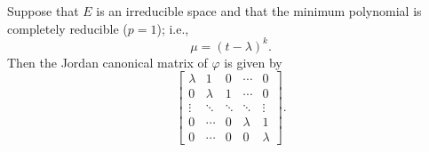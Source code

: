 Suppose that $E$ is an irreducible space and that the minimum polynomial is completely reducible ($p=1$); i.e.,
$$\mu = (t - \lambda)^k.$$
Then the Jordan canonical matrix of $\varphi$ is given by
$$\begin{bmatrix}
\lambda & 1 & 0 & \cdots & 0 \\
0 & \lambda & 1 & \cdots & 0 \\
\vdots & \ddots & \ddots & \ddots & \vdots \\
0 & \cdots & 0 & \lambda & 1 \\
0 & \cdots & 0 & 0 & \lambda
\end{bmatrix}.$$
